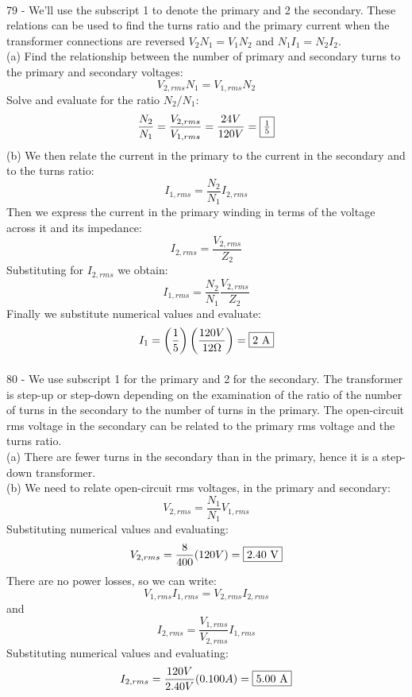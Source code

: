 \documentclass{report}
\begin{document}
\paragraph{}
79 - We'll use the subscript 1 to denote the primary and 2 the secondary. These relations can be used to find the turns ratio and the primary current when the transformer connections are reversed $V_2N_1 = V_1N_2$ and $N_1I_1 = N_2I_2$.\\
(a) Find the relationship between the number of primary and secondary turns to the primary and secondary voltages:
$$V_{2,rms}N_1 = V_{1,rms}N_2$$
Solve and evaluate for the ratio $N_2 / N_1$:
$$\frac{N_2}{N_1} = \frac{V_{2,rms}}{V_{1,rms}} = \frac{24 V}{120 V} = \fbox{$\frac{1}{5}$}$$
(b) We then relate the current in the primary to the current in the secondary and to the turns ratio:
$$I_{1,rms} = \frac{N_2}{N_1}I_{2,rms}$$
Then we express the current in the primary winding in terms of the voltage across it and its impedance:
$$I_{2,rms} = \frac{V_{2,rms}}{Z_2}$$
Substituting for $I_{2,rms}$ we obtain:
$$I_{1,rms} = \frac{N_2}{N_1}\frac{V_{2,rms}}{Z_2}$$
Finally we substitute numerical values and evaluate:
$$I_1 = \left( \frac{1}{5} \right) \left( \frac{120 V}{12 \Omega} \right) = \fbox{2 A}$$

\paragraph{}
80 - We use subscript 1 for the primary and 2 for the secondary. The transformer is step-up or step-down depending on the examination of the ratio of the number of turns in the secondary to the number of turns in the primary. The open-circuit rms voltage in the secondary can be related to the primary rms voltage and the turns ratio.\\
(a) There are fewer turns in the secondary than in the primary, hence it is a step-down transformer.\\
(b) We need to relate open-circuit rms voltages, in the primary and secondary:
$$V_{2,rms} = \frac{N_1}{N_1}V_{1,rms}$$
Substituting numerical values and evaluating:
$$V_{2,rms} = \frac{8}{400}(120 V) = \fbox{2.40 V}$$
There are no power losses, so we can write:
$$V_{1,rms}I_{1,rms} = V_{2,rms}I_{2,rms}$$
and
$$I_{2,rms} = \frac{V_{1,rms}}{V_{2,rms}}I_{1,rms}$$
Substituting numerical values and evaluating:
$$I_{2,rms} = \frac{120 V}{2.40 V}(0.100 A) = \fbox{5.00 A}$$
\end{document}
